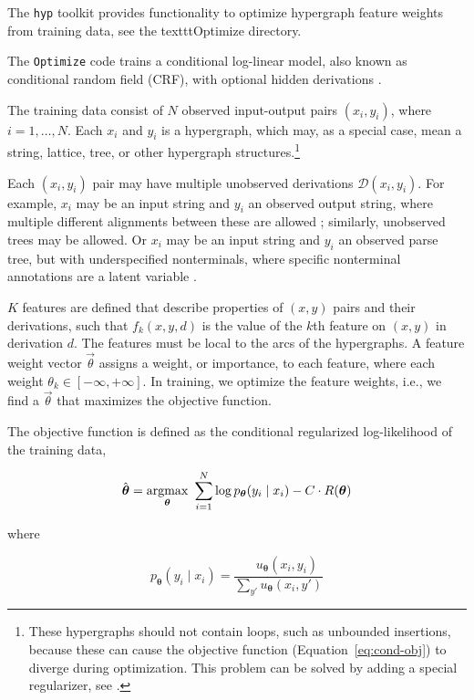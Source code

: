 \documentclass[12pt]{article}
\newcommand{\hyp}{\texttt{hyp}\xspace}
\newcommand{\vtheta}{\boldsymbol{\theta}}
\newcommand{\ptheta}{p_{\vtheta}}
\newcommand{\utheta}{u_{\vtheta}}
\newcommand\argmax{\operatornamewithlimits{argmax}}
\renewcommand{\eqref}[1]{Equation~\ref{eq:#1}}
\let\cite\citep    %
\let\newcite\citet %
\begin{document}
The \hyp toolkit provides functionality to optimize hypergraph feature
weights from training data, see the texttt{Optimize} directory.

The \texttt{Optimize} code trains a conditional log-linear model, also
known as conditional random field (CRF), with optional hidden
derivations \cite{lafferty01, quattoni-et-al:2007:latent-crf}.

The training data consist of $N$ observed input-output pairs $(x_i,
y_i)$, where $i=1,\dots,N$. Each $x_i$ and $y_i$ is a hypergraph,
which may, as a special case, mean a string, lattice, tree, or other
hypergraph structures.\footnote{These hypergraphs should not contain
  loops, such as unbounded insertions, because these can cause the
  objective function (\eqref{cond-obj}) to diverge during
  optimization. This problem can be solved by adding a special
  regularizer, see \newcite{dreyer-thesis}.}

Each $(x_i, y_i)$ pair may have multiple unobserved derivations
$\mathcal{D}(x_i,y_i)$. For example, $x_i$ may be an input string and
$y_i$ an observed output string, where multiple different alignments
between these are allowed \cite{dreyer-smith-eisner:2008:emnlp};
similarly, unobserved trees may be allowed. Or $x_i$ may be an input
string and $y_i$ an observed parse tree, but with underspecified
nonterminals, where specific nonterminal annotations are a latent
variable \cite{petrov_klein_2008}.

$K$ features are defined that describe properties of $(x, y)$ pairs
and their derivations, such that $f_k(x,y,d)$ is the value of the
$k$th feature on $(x,y)$ in derivation $d$. The features must be local
to the arcs of the hypergraphs. A feature weight vector $\vec{\theta}$
assigns a weight, or importance, to each feature, where each weight
$\theta_k \in [-\infty, +\infty]$. In training, we optimize the
feature weights,
i.e., we find a $\vec{\theta}$ that maximizes the objective function.

The objective function is defined as the conditional regularized
log-likelihood of the training data,

\begin{equation}\label{eq:cond-obj}
  \hat{\vtheta} = \argmax_{\vtheta} \ \sum_{i=1}^N \log\ptheta(y_i\mid
  x_i) - C \cdot R(\vtheta)
\end{equation}

where

\begin{equation}\label{eq:cond-obj-i}
  \ptheta(y_i \mid x_i) =
  \frac{\ \ \ \ \ \ \utheta(x_i,y_i)}{\sum_{y'}\utheta(x_i, y') }
\end{equation}
\end{document}
